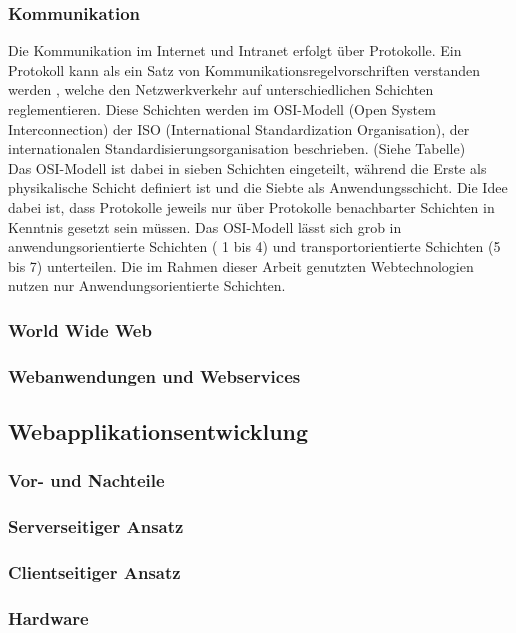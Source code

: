 \subsubsection{Kommunikation}\label{sec:kommunikation}
Die Kommunikation im Internet und Intranet erfolgt über Protokolle. 
Ein Protokoll kann als ein Satz von Kommunikationsregelvorschriften verstanden werden \cite{safran2011webtechnologien}, welche den Netzwerkverkehr auf unterschiedlichen Schichten reglementieren. 
Diese Schichten werden im OSI-Modell (Open System Interconnection) der ISO (International Standardization Organisation), der internationalen Standardisierungsorganisation beschrieben. (Siehe Tabelle) %
\\ 
Das OSI-Modell ist dabei in sieben Schichten eingeteilt, während die Erste als  physikalische Schicht definiert ist und die Siebte als Anwendungsschicht. Die Idee dabei ist, dass Protokolle jeweils nur über Protokolle benachbarter Schichten in Kenntnis gesetzt sein müssen. Das OSI-Modell lässt sich grob in anwendungsorientierte Schichten ( 1 bis 4) und transportorientierte Schichten (5 bis 7) unterteilen. Die im Rahmen dieser Arbeit genutzten Webtechnologien nutzen nur Anwendungsorientierte Schichten.



\subsubsection{World Wide Web}\label{sec:www}
%
\subsubsection{Webanwendungen und Webservices}\label{sec:webanwenservices}


\subsection{Webapplikationsentwicklung}\label{sec:softwareentwicklung}
\subsubsection{Vor- und Nachteile}\label{sec:vorundnachteileweb}
\subsubsection{Serverseitiger Ansatz}\label{sec:serverseitgeransatz}
\subsubsection{Clientseitiger Ansatz}\label{sec:clientseitigeransatz}
\subsubsection{Hardware}\label{sec:hardware}